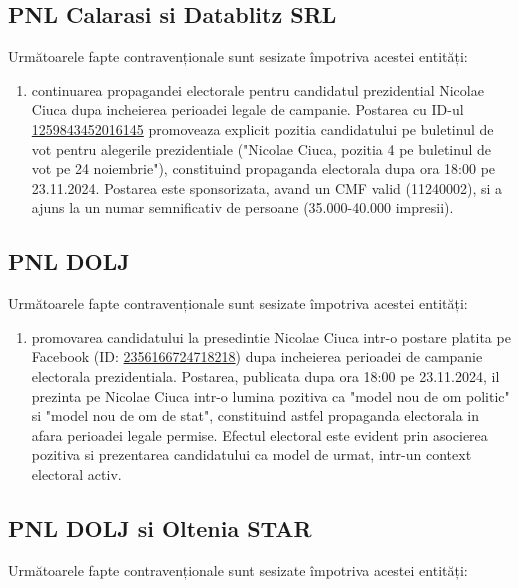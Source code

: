 \documentclass[a4paper,12pt]{article}
\begin{document}
\vspace{0.5cm}

\subsection{PNL Calarasi si Datablitz SRL}
Următoarele fapte contravenționale sunt sesizate împotriva acestei entități:

\begin{enumerate}[leftmargin=*, label=\arabic*.)]
    \item continuarea propagandei electorale pentru candidatul prezidential Nicolae Ciuca dupa incheierea perioadei legale de campanie. Postarea cu ID-ul \href{https://www.facebook.com/ads/library/?id=1259843452016145}{1259843452016145} promoveaza explicit pozitia candidatului pe buletinul de vot pentru alegerile prezidentiale ("Nicolae Ciuca, pozitia 4 pe buletinul de vot pe 24 noiembrie"), constituind propaganda electorala dupa ora 18:00 pe 23.11.2024. Postarea este sponsorizata, avand un CMF valid (11240002), si a ajuns la un numar semnificativ de persoane (35.000-40.000 impresii).
\end{enumerate}

\vspace{0.5cm}

\subsection{PNL DOLJ}
Următoarele fapte contravenționale sunt sesizate împotriva acestei entități:

\begin{enumerate}[leftmargin=*, label=\arabic*.)]
    \item promovarea candidatului la presedintie Nicolae Ciuca intr-o postare platita pe Facebook (ID: \href{https://www.facebook.com/ads/library/?id=2356166724718218}{2356166724718218}) dupa incheierea perioadei de campanie electorala prezidentiala. Postarea, publicata dupa ora 18:00 pe 23.11.2024, il prezinta pe Nicolae Ciuca intr-o lumina pozitiva ca "model nou de om politic" si "model nou de om de stat", constituind astfel propaganda electorala in afara perioadei legale permise. Efectul electoral este evident prin asocierea pozitiva si prezentarea candidatului ca model de urmat, intr-un context electoral activ.
\end{enumerate}

\vspace{0.5cm}

\subsection{PNL DOLJ si Oltenia STAR}
Următoarele fapte contravenționale sunt sesizate împotriva acestei entități:
\end{document}

